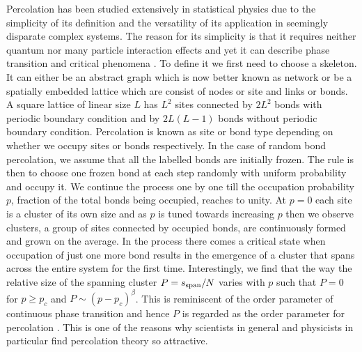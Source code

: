 \documentclass[twocolumn,showpacs,preprintnumbers,amsmath,amssymb]{article}
\begin{document}
Percolation has been studied extensively in statistical physics due to the simplicity of its 
definition and the versatility of its application in seemingly disparate complex systems. 
The reason for its simplicity is that it requires neither quantum nor
many particle interaction effects and yet it can describe phase transition
and critical phenomena \cite{ref.Stauffer, ref.saberi}. 
To define it we first need to choose a skeleton. It can either be an abstract graph which is now
better known as network or be a spatially embedded lattice
which are consist of nodes or site and links or bonds.  
A square lattice of linear size $L$ has 
$L^2$ sites connected by $2L^2$  bonds with periodic boundary condition and by
$2L(L-1)$ bonds without periodic boundary condition. Percolation 
is known as site or bond type depending on whether we occupy sites or bonds respectively.
In the case of random bond percolation, we assume that all the labelled
bonds are initially frozen. The rule  is then  to choose 
one frozen bond at each step randomly with uniform probability and occupy it. We continue the process one by one till the 
occupation probability $p$, fraction of the total bonds being occupied, reaches to unity. 
At $p=0$ each site is a cluster of its own size and as $p$ is tuned towards increasing $p$
then we observe clusters, a group of sites connected by occupied bonds, are continuously
formed and grown on the average. In the process there 
comes a critical state when occupation of just one more bond results in the emergence of a 
cluster that spans 
across the entire system for the first time. Interestingly, we find that the way the 
relative size of the spanning cluster $P=s_{{\rm span}}/N$ varies 
with $p$ such that $P=0$ for $p\geq p_c$ and $P\sim (p-p_c)^\beta$. This is reminiscent of the order parameter of continuous phase transition
and hence $P$ is regarded as the order parameter for percolation \cite{ref.Stanley, ref.Binney}.
This is one of the reasons why scientists in general and physicists in particular find percolation theory so attractive. 
 
\end{document}
